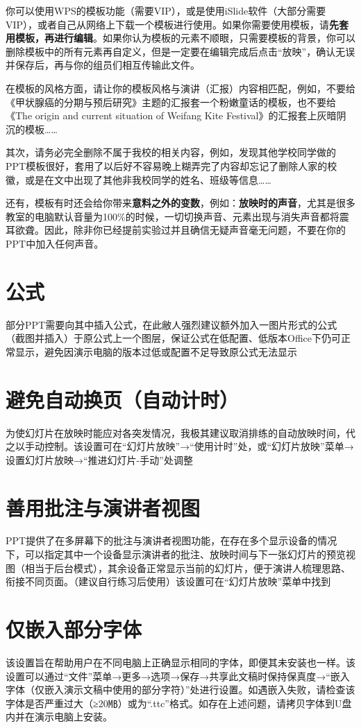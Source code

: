你可以使用WPS的模板功能（需要VIP），或是使用iSlide软件（大部分需要VIP），或者自己从网络上下载一个模板进行使用。如果你需要使用模板，请\textbf{先套用模板，再进行编辑}。如果你认为模板的元素不顺眼，只需要模板的背景，你可以删除模板中的所有元素再自定义，但是一定要在编辑完成后点击“放映”，确认无误并保存后，再与你的组员们相互传输此文件。

在模板的风格方面，请让你的模板风格与演讲（汇报）内容相匹配，例如，不要给《甲状腺癌的分期与预后研究》主题的汇报套一个粉嫩童话的模板，也不要给《The origin and current situation of Weifang Kite Festival》的汇报套上灰暗阴沉的模板……

其次，请务必完全删除不属于我校的相关内容，例如，发现其他学校同学做的PPT模板很好，套用了以后好不容易晚上糊弄完了内容却忘记了删除人家的校徽，或是在文中出现了其他非我校同学的姓名、班级等信息……

还有，模板有时还会给你带来\textbf{意料之外的变数}，例如：\textbf{放映时的声音}，尤其是很多教室的电脑默认音量为100\%的时候，一切切换声音、元素出现与消失声音都将震耳欲聋。因此，除非你已经提前实验过并且确信无疑声音毫无问题，不要在你的PPT中加入任何声音。

\section[公式]{公式}
部分PPT需要向其中插入公式，在此敝人强烈建议额外加入一图片形式的公式（截图并插入）于原公式上一个图层，保证公式在低配置、低版本Office下仍可正常显示，避免因演示电脑的版本过低或配置不足导致原公式无法显示

\section[避免自动换页（自动计时）]{避免自动换页（自动计时）}
为使幻灯片在放映时能应对各突发情况，我极其建议取消排练的自动放映时间，代之以手动控制。该设置可在“幻灯片放映”→“使用计时”处，或“幻灯片放映”菜单→设置幻灯片放映→“推进幻灯片-手动”处调整

\section[善用批注与演讲者视图]{善用批注与演讲者视图}
PPT提供了在多屏幕下的批注与演讲者视图功能，在存在多个显示设备的情况下，可以指定其中一个设备显示演讲者的批注、放映时间与下一张幻灯片的预览视图（相当于后台模式），其余设备正常显示当前的幻灯片，便于演讲人梳理思路、衔接不同页面。（建议自行练习后使用）该设置可在“幻灯片放映”菜单中找到

\section[仅嵌入部分字体]{仅嵌入部分字体}
该设置旨在帮助用户在不同电脑上正确显示相同的字体，即便其未安装也一样。该设置可以通过“文件”菜单→更多→选项→保存→共享此文稿时保持保真度→“嵌入字体（仅嵌入演示文稿中使用的部分字符）”处进行设置。如遇嵌入失败，请检查该字体是否严重过大（≥20㎆）或为“.ttc”格式。如存在上述问题，请拷贝字体到U盘内并在演示电脑上安装。

